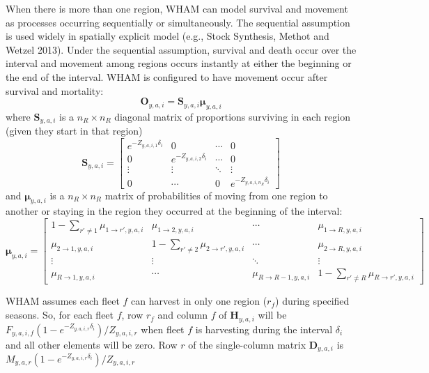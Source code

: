 \documentclass[
]{article}
\begin{document}
When there is more than one region, WHAM can model survival and movement
as processes occurring sequentially or simultaneously. The sequential
assumption is used widely in spatially explicit model (e.g., Stock
Synthesis, Methot and Wetzel 2013). Under the sequential assumption,
survival and death occur over the interval and movement among regions
occurs instantly at either the beginning or the end of the interval.
WHAM is configured to have movement occur after survival and mortality:
\begin{equation*}
  \mathbf{O}_{y,a,i} = \mathbf{S}_{y,a,i}\boldsymbol{\mu}_{y,a,i}
\end{equation*} where \(\mathbf{S}_{y,a,i}\) is a \(n_R \times n_R\)
diagonal matrix of proportions surviving in each region (given they
start in that region) \begin{equation*}
\mathbf{S}_{y,a,i} = 
  \begin{bmatrix}
    e^{-Z_{y,a,i,1}\delta_i} & 0 & \cdots & 0 \\
    0 & e^{-Z_{y,a,i,2}\delta_i} & \cdots & 0 \\
    \vdots & \vdots & \ddots & \vdots \\
    0 & \cdots & 0 & e^{-Z_{y,a,i,n_R}\delta_i}
  \end{bmatrix}
\end{equation*} and \(\boldsymbol{\mu}_{y,a,i}\) is a \(n_R \times n_R\)
matrix of probabilities of moving from one region to another or staying
in the region they occurred at the beginning of the interval:
\begin{equation*}
\boldsymbol{\mu}_{y,a,i} = 
  \begin{bmatrix}
    1-\sum_{r' \neq 1} \mu_{1\rightarrow r',y,a,i} & \mu_{1\rightarrow 2,y,a,i} & \cdots & \mu_{1\rightarrow R,y,a,i} \\
    \mu_{2\rightarrow 1,y,a,i} & 1-\sum_{r' \neq 2} \mu_{2\rightarrow r',y,a,i} & \cdots & \mu_{2\rightarrow R,y,a,i} \\
    \vdots & \vdots & \ddots & \vdots \\
    \mu_{R\rightarrow 1,y,a,i} & \cdots & \mu_{R\rightarrow R-1,y,a,i} & 1-\sum_{r' \neq R} \mu_{R\rightarrow r',y,a,i}
  \end{bmatrix}
\end{equation*}

WHAM assumes each fleet \(f\) can harvest in only one region (\(r_f\))
during specified seasons. So, for each fleet \(f\), row \(r_f\) and
column \(f\) of \(\mathbf{H}_{y,a,i}\) will be
\(F_{y,a,i,f}\left(1 - e^{-Z_{y,a,i,r}\delta_i}\right)/Z_{y,a,i,r}\)
when fleet \(f\) is harvesting during the interval \(\delta_i\) and all
other elements will be zero. Row \(r\) of the single-column matrix
\(\mathbf{D}_{y,a,i}\) is
\(M_{y,a,r}\left(1 - e^{-Z_{y,a,i,r}\delta_i}\right)/Z_{y,a,i,r}\)
\end{document}
